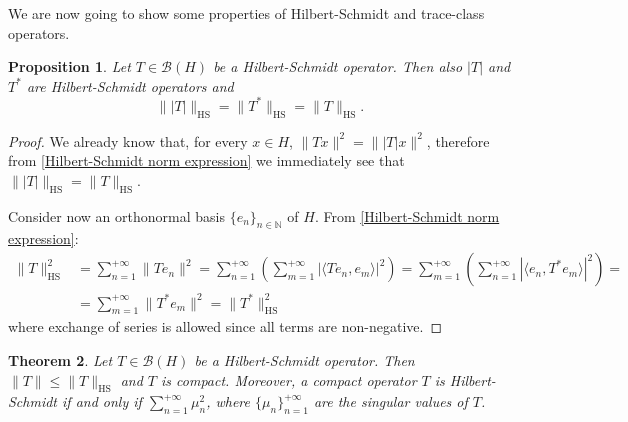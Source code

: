 \documentclass[corpo=11pt, stile=classica, tipotesi=custom,
greek, evenboxes, english]{toptesi}
\numberwithin{equation}{chapter}
\newtheorem{teo}{Theorem}[chapter] %
\newtheorem{prop}[teo]{Proposition}
\theoremstyle{remark}
\newcommand{\N}{\mathbb{N}} %
\newcommand{\B}{\mathscr{B}} %
\begin{document}
We are now going to show some properties of Hilbert-Schmidt and trace-class operators.
\begin{prop}\label{|T| and T^* are Hilbert-Schmidt}
	Let $T \in \B(H)$ be a Hilbert-Schmidt operator. Then also $|T|$ and $T^*$ are Hilbert-Schmidt operators and 
	\begin{equation}\label{Hilbert-Schmidt norm of |T| and T^*}
		\| |T| \|_{\mathrm{HS}} = \| T^* \|_{\mathrm{HS}} = \| T \|_{\mathrm{HS}}.
	\end{equation}
\end{prop}
\begin{proof}
	We already know that, for every $x \in H$, $\|Tx\|^2 = \||T|x\|^2$, therefore from \eqref{Hilbert-Schmidt norm expression} we immediately see that $ \| |T| \|_{\mathrm{HS}} = \| T \|_{\mathrm{HS}}$.
	
	Consider now an orthonormal basis $\{e_n\}_{n \in \N}$ of $H$. From \eqref{Hilbert-Schmidt norm expression}:
	\begin{align*}
		\|T\|_{\mathrm{HS}}^2 &= \sum_{n=1}^{+\infty} \|Te_n\|^2 = \sum_{n=1}^{+\infty} \left(\sum_{m=1}^{+\infty} |\langle Te_n,e_m \rangle|^2\right) = \sum_{m=1}^{+\infty} \left(\sum_{n=1}^{+\infty} |\langle e_n, T^*e_m \rangle|^2\right) =\\
							&= \sum_{m=1}^{+\infty} \|T^* e_m\|^2 = \|T^*\|_{\mathrm{HS}}^2
	\end{align*}
	where exchange of series is allowed since all terms are non-negative.
\end{proof}
\begin{teo}\label{Hilbert-Schmidt operators are compact and bounded}
	Let $T \in \B(H)$ be a Hilbert-Schmidt operator. Then $\|T\| \leq \|T\|_{\mathrm{HS}}$ and $T$ is compact. Moreover, a compact operator $T$ is Hilbert-Schmidt if and only if $\sum_{n=1}^{+\infty} \mu_n^2$, where $\{\mu_n\}_{n=1}^{+\infty}$ are the singular values of $T$.
\end{teo}
\end{document}
